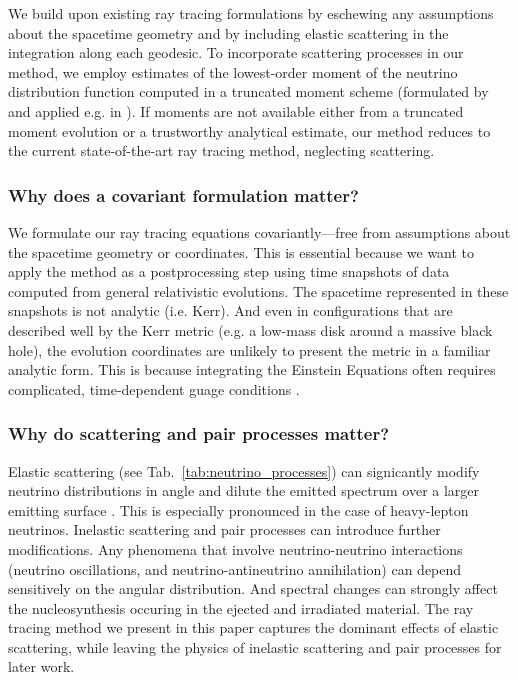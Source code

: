 \documentclass[aps,floatfix,prd,superscriptaddress,twocolumn]{revtex4-1}
\newcommand{\todo}[1]{\marginpar{\tiny{\textcolor{red}{#1}}}}
\begin{document}
We build upon existing ray tracing formulations
by eschewing any assumptions about the spacetime geometry
and by including elastic scattering in the integration along each
geodesic.
To incorporate scattering processes in our method, we employ estimates of the
lowest-order moment of the neutrino distribution function
computed in a truncated moment scheme (formulated by
\cite{thor1981-truncated_moment, shib2011-truncated_moment}
and applied e.g. in \cite{ramp2002-truncated_moment,
  card2013-truncated_moment, fouc2015-m1_nsbh, ocon2015-gr1d_with_nu}).
If moments are not available either from
a truncated moment evolution or a trustworthy analytical estimate,
our method reduces to the current state-of-the-art ray tracing method,
neglecting scattering.

\subsubsection*{Why does a covariant formulation matter?}
We formulate our ray tracing equations covariantly---free from
assumptions about the spacetime geometry or coordinates. This is essential
because we want to apply the method as a postprocessing step using
time snapshots of data computed from general relativistic evolutions.
The spacetime represented in these snapshots is not analytic (i.e. Kerr).
And even in configurations that are described well by the Kerr metric
(e.g. a low-mass disk around a massive black hole),
the evolution coordinates are unlikely to present the metric in
a familiar analytic form.
This is because integrating the Einstein Equations often requires complicated,
time-dependent guage conditions
\citep{lind2007-gen_harmonic, fouc2013-compactness_and_spin}.

\subsubsection*{Why do scattering and pair processes matter?}
Elastic scattering (see Tab.~\ref{tab:neutrino_processes}) can signicantly
modify neutrino distributions in angle and dilute the emitted spectrum over a
larger emitting surface \citep{pere2016-asl}.
This is especially pronounced in the case of heavy-lepton neutrinos.
\todo{cite}
Inelastic scattering and pair processes can introduce further modifications.
Any phenomena that involve neutrino-neutrino interactions (neutrino oscillations,
and neutrino-antineutrino annihilation) can depend sensitively on the angular
distribution.
And spectral changes can strongly affect the nucleosynthesis
occuring in the ejected and irradiated material.
\todo{justify these statements}
The ray tracing method we present in this paper captures the dominant effects
of elastic scattering, while leaving the physics of inelastic scattering and
pair processes for later work.
\end{document}
